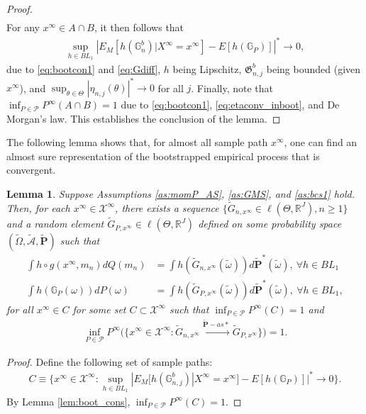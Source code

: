 \documentclass[letterpaper,11pt]{article}
\theoremstyle{myplain}
\newtheorem{lemma}{Lemma}[section]
\theoremstyle{mydefinition}
\theoremstyle{myremark}
\numberwithin{equation}{section}
\numberwithin{figure}{section}
\begin{document}
\begin{appendices}
\begin{proof}
\begin{align}
\end{align}
For any $x^\infty\in A\cap B$, it then follows that
\begin{align}
	\sup_{h\in BL_1}\left|E_M[h(\mathbb G^b_{n})|X^\infty=x^\infty]-E[h(\mathbb G_P)]\right|^*\to 0,\label{eq:bootcon2}
\end{align}
due to \eqref{eq:bootcon1} and \eqref{eq:Gdiff}, $h$ being Lipschitz, $\mathfrak G^b_{n,j}$ being bounded (given $x^\infty$), and  $\sup_{\theta\in\Theta}|\eta_{n,j}(\theta)|^*\to 0$ for all $j$. Finally, note that $\inf_{P\in\mathcal P}P^\infty(A\cap B)=1$ due to \eqref{eq:bootcon1}, \eqref{eq:etaconv_inboot}, and De Morgan's law.
This establishes the conclusion of the lemma.	
\end{proof}

The following lemma shows that, for almost all sample path $x^\infty$, one can find an almost sure representation of the bootstrapped empirical process that is convergent.
\begin{lemma}\label{lem:asrep}
Suppose Assumptions \ref{as:momP_AS}, \ref{as:GMS}, and \ref{as:bcs1} hold. Then, for each $x^\infty\in\mathcal X^\infty$, there exists a sequence $\{\tilde G_{n,x^\infty}\in \ell(\Theta,\mathbb R^J),n\ge 1\}$ and a random element $\tilde G_{P,x^\infty}\in \ell(\Theta,\mathbb R^J)$ defined on some probability space $(\tilde\Omega,\tilde{\mathcal A},\tilde{\mathbf P})$ such that
\begin{align}
	\int h\circ g(x^\infty,m_n)dQ(m_n)&=\int h(\tilde G_{n,x^\infty}(\tilde \omega))d\tilde{\mathbf P}^*(\tilde\omega),~\forall h\in BL_1\\
	\int h(\mathbb G_P(\omega))dP(\omega)&=\int h(\tilde G_{P,x^\infty}(\tilde \omega))d\tilde{\mathbf P}^*(\tilde\omega),~\forall h\in BL_1,
\end{align}
for all $x^\infty\in C$ for some set $C\subset \mathcal X^\infty$ such that $\inf_{P\in\mathcal P}P^\infty(C)=1$ and
\begin{align}
	\inf_{P\in\mathcal P}P^\infty\Big(\big\{x^\infty\in \mathcal X^\infty:\tilde G_{n,x^\infty}\stackrel{\tilde{\mathbf P}-as*}{\to}\tilde G_{P,x^\infty}\big\}\Big)=1.\label{eq:asconv1}
\end{align}
\end{lemma}

\begin{proof}
Define the following set of sample paths:
\begin{align}
	C\equiv \Big\{x^\infty\in\mathcal X^\infty:\sup_{h\in BL_1}|E_M[h(\mathbb G^b_{n,j})|X^\infty=x^\infty]-E[h(\mathbb G_P)]|^*\to 0\Big\}.
\end{align}
By Lemma \ref{lem:boot_cons}, 	$\inf_{P\in\mathcal P}P^\infty(C)=1$.
	

\end{proof}
\end{appendices}
\end{document}
